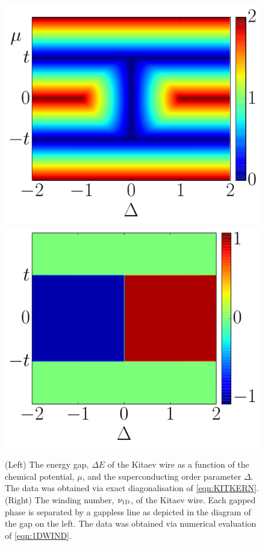\begin{figure}
    \begin{center}
        \includegraphics[scale=0.4]{Chapter1/Chapter1Figs/PDF/kitwind.pdf}
        \includegraphics[scale=0.4]{Chapter1/Chapter1Figs/PDF/kitgap.pdf}
    \end{center}
    \caption{(Left) The energy gap, $\Delta E$ of the Kitaev wire as a function of the chemical potential, $\mu$, and the superconducting order parameter $\Delta$. The data was obtained via exact diagonalisation of \eqref{eqn:KITKERN}. (Right) The winding number, $\nu_{\text{1D}}$, of the Kitaev wire. Each gapped phase is separated by a gappless line as depicted in the diagram of the gap on the left. The data was obtained via numerical evaluation of \eqref{eqn:1DWIND}. }
    \label{fig:kitspec}
\end{figure}

